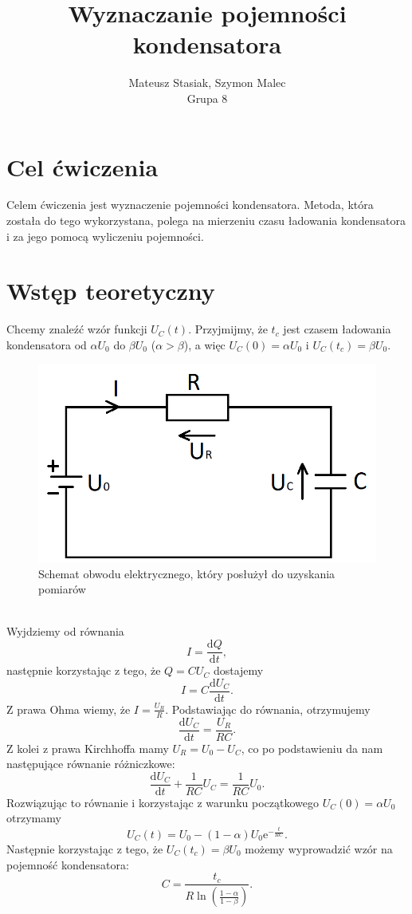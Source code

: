 \documentclass[12pt]{mwart}
\author{Mateusz Stasiak, Szymon Malec \\ Grupa 8}
\title{Wyznaczanie pojemności kondensatora}
\begin{document}
	\maketitle
	
	\section{Cel ćwiczenia}
	\noindent Celem ćwiczenia jest wyznaczenie pojemności kondensatora. Metoda, która została do tego wykorzystana, polega na mierzeniu czasu ładowania kondensatora i za jego pomocą wyliczeniu pojemności.
	
	\section{Wstęp teoretyczny}
	\noindent Chcemy znaleźć wzór funkcji $ U_C(t) $. Przyjmijmy, że $t_c$ jest czasem ładowania kondensatora od $ \alpha U_0 $ do $ \beta U_0 $ ($\alpha > \beta$), a więc $ U_C(0) = \alpha U_0 $ i $ U_C(t_c) = \beta U_0 $.
	\begin{figure}[h]
		\begin{center}
			\includegraphics[scale=0.36]{obwód.png}
			\caption{Schemat obwodu elektrycznego, który posłużył do uzyskania pomiarów}
		\end{center}
	\end{figure}\\
	Wyjdziemy od równania
	$$ I = \frac{\mathrm{d}Q}{\mathrm{d}t}, $$
	następnie korzystając z tego, że $ Q = C U_C $ dostajemy
	$$ I = C \frac{\mathrm{d}U_C}{\mathrm{d}t}. $$
	Z prawa Ohma wiemy, że $ I = \frac{U_R}{R} $. Podstawiając do równania, otrzymujemy
	$$ \frac{\mathrm{d}U_C}{\mathrm{d}t} = \frac{U_R}{RC}. $$
	Z kolei z prawa Kirchhoffa mamy $ U_R = U_0 - U_C $, co po podstawieniu da nam następujące równanie różniczkowe:
	$$ \frac{\mathrm{d}U_C}{\mathrm{d}t} + \frac{1}{RC} U_C = \frac{1}{RC} U_0. $$
	Rozwiązując to równanie i korzystając z warunku początkowego $ U_C(0) = \alpha U_0 $ otrzymamy
	$$
		U_C(t) = U_0 - (1 - \alpha) U_0 \mathrm{e}^{-\frac{t}{RC}}.
	$$
	Następnie korzystając z tego, że $ U_C(t_c) = \beta U_0 $ możemy wyprowadzić wzór na pojemność kondensatora:
	\begin{equation}
		C = \frac{t_c}{R \ln{\left(\frac{1 - \alpha}{1 - \beta}\right)}}.
	\end{equation}
	
\end{document}
